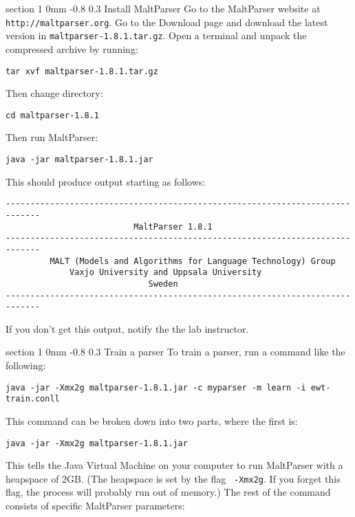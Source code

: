 \documentclass[11pt]{article}
\makeatletter
\newcommand{\newsec}[2]{\section{#1}\label{sec:#2}\noindent}
\renewcommand{\section}{\@startsection
{section}%
{1}%
{0mm}%
{-0.8\baselineskip}%
{0.3\baselineskip}%
{\bfseries\large}}%
\makeatother
\begin{document}
\newsec{Install MaltParser}{malt}%
Go to the MaltParser website at {\tt http://maltparser.org}. Go to the Download page and download the latest version in {\tt maltparser-1.8.1.tar.gz}. Open a terminal and unpack the compressed archive by running:
\begin{small}
\begin{verbatim}
tar xvf maltparser-1.8.1.tar.gz
\end{verbatim}
\end{small}
Then change directory:
\begin{small}
\begin{verbatim}
cd maltparser-1.8.1
\end{verbatim}
\end{small}
Then run MaltParser:
\begin{small}
\begin{verbatim}
java -jar maltparser-1.8.1.jar
\end{verbatim}
\end{small}
This should produce output starting as follows:
\begin{small}
\begin{verbatim}
-----------------------------------------------------------------------------
                          MaltParser 1.8.1                             
-----------------------------------------------------------------------------
         MALT (Models and Algorithms for Language Technology) Group          
             Vaxjo University and Uppsala University                         
                             Sweden                                          
-----------------------------------------------------------------------------
\end{verbatim}
\end{small}
If you don't get this output, notify the the lab instructor.

\newsec{Train a parser}{train}%
To train a parser, run a command like the following:
\begin{small}
\begin{verbatim}
java -jar -Xmx2g maltparser-1.8.1.jar -c myparser -m learn -i ewt-train.conll 
\end{verbatim}
\end{small}
This command can be broken down into two parts, where the first is:
\begin{small}
\begin{verbatim}
java -jar -Xmx2g maltparser-1.8.1.jar
\end{verbatim}
\end{small}
This tells the Java Virtual Machine on your computer to run MaltParser
with a heapspace of 2GB. (The heapspace is set by the flag {\tt
  -Xmx2g}. If you forget this flag, the process will probably run out
of memory.)  The rest of the command consists of specific MaltParser
parameters:
\end{document}
